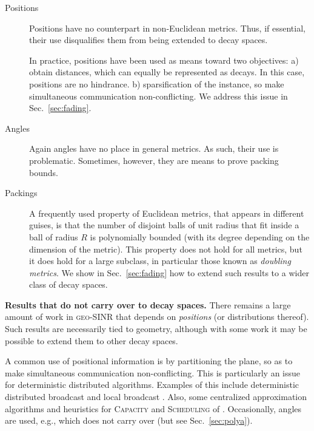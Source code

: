 \documentclass[11pt]{amsart}
\newcommand{\prob}[1]{\textsc{#1}}
\newcommand{\Capacity}{\prob{Capacity}}
\newcommand{\capacity}{\Capacity}
\newcommand{\Scheduling}{\prob{Scheduling}}
\newcommand{\scheduling}{\Scheduling}
\newcommand{\geomodel}{\textsc{geo-SINR}}
\newcommand{\mypara}[1]{\smallskip\noindent\textbf{#1.}}  \newcommand{\tightpara}[1]{\noindent\textbf{#1.}}  \newcommand{\inddim}{D}
\newcommand{\authorcomment}[1]{}
\begin{document}
\begin{description}
\item[Positions] Positions have no counterpart in non-Euclidean
  metrics\authorcomment{That have been considered in this context, at
    least; non-Euclidean geometries with coordinate structures do
    exist.}.  Thus, if essential, their use disqualifies them from
  being extended to decay spaces.

In practice, positions have been used as means toward two objectives:
a) obtain distances, which can equally be represented as decays.
In this case, positions are no hindrance.
b) sparsification of the instance, so make
simultaneous communication non-conflicting.
We address this issue in Sec.~\ref{sec:fading}. 

\item[Angles] Again angles have no place in general metrics.
As such, their use is problematic. Sometimes, however, they are means
to prove packing bounds.
\item[Packings] A frequently used property of Euclidean metrics, that
  appears in different guises, is that
the number of disjoint balls of unit radius that fit inside a ball of
radius $R$ is polynomially bounded (with its degree depending on the
dimension of the metric). This property does not hold for all metrics,
but it does hold for a large subclass, in particular those known as
\emph{doubling metrics}. We show in Sec.~\ref{sec:fading} how to
extend such results to a wider class of decay spaces.
\end{description}
\fi

\mypara{Results that do not carry over to decay spaces}
There remains a large amount of work in {\geomodel} that depends on
\emph{positions} (or distributions thereof). 
Such results are necessarily tied to geometry, although with some work
it may be possible to extend them to other decay spaces.

A common use of positional information is by partitioning the
plane, so as to make simultaneous communication non-conflicting. This
is particularly an issue for deterministic distributed algorithms.
Examples of this include deterministic distributed broadcast
\cite{JurdzinskiKRS13, JurdzinskiKS13FCT} and local broadcast
\cite{JurdzinskiK12, FuchsW13}.  Also, some centralized approximation
algorithms and heuristics for {\capacity} and {\scheduling} of
\cite{gouss2007, DBLP:journals/corr/abs-1208-0627}.  
Occasionally, angles are used, e.g.\cite{GHWW09}, which does not carry over
(but see Sec.~\ref{sec:polya}).
\end{document}
